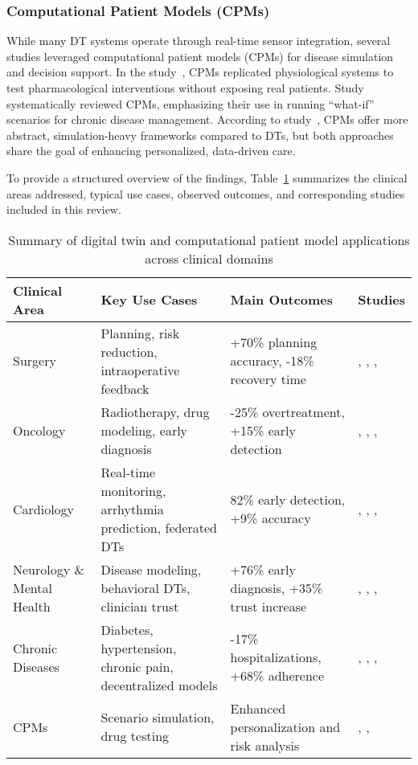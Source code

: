 \documentclass[10pt,a4paper]{article}
\begin{document}
\subsubsection*{Computational Patient Models (CPMs)}
While many DT systems operate through real-time sensor integration, several studies leveraged computational patient models (CPMs) for disease simulation and decision support.  
In the study~\cite{Balasubramanyam2024}, CPMs replicated physiological systems to test pharmacological interventions without exposing real patients.  
Study~\cite{Khater2024b} systematically reviewed CPMs, emphasizing their use in running “what-if” scenarios for chronic disease management.  
According to study~\cite{Fekonja2024}, CPMs offer more abstract, simulation-heavy frameworks compared to DTs, but both approaches share the goal of enhancing personalized, data-driven care.


To provide a structured overview of the findings, Table~\ref{tabella2} summarizes the clinical areas addressed, typical use cases, observed outcomes, and corresponding studies included in this review.

\begin{table}[H]
\centering
\caption{Summary of digital twin and computational patient model applications across clinical domains}
\label{tabella2}
\begin{tabular}{|p{2.6cm}|p{5cm}|p{5cm}|p{2cm}|}
\hline
\textbf{Clinical Area} & \textbf{Key Use Cases} & \textbf{Main Outcomes} & \textbf{Studies} \\
\hline
Surgery & Planning, risk reduction, intraoperative feedback & +70\% planning accuracy, -18\% recovery time & \cite{liu2019}, \cite{Liang2024}, \cite{Fekonja2024}, \cite{bjelland2022} \\
\hline
Oncology & Radiotherapy, drug modeling, early diagnosis & -25\% overtreatment, +15\% early detection & \cite{Cellina2023}, \cite{Puranik2022}, \cite{wu2022}, \cite{Balasubramanyam2024} \\
\hline
Cardiology & Real-time monitoring, arrhythmia prediction, federated DTs & 82\% early detection, +9\% accuracy & \cite{liu2019}, \cite{Khater2024b}, \cite{Ali2023}, \cite{Lu2023} \\
\hline
Neurology \& Mental Health & Disease modeling, behavioral DTs, clinician trust & +76\% early diagnosis, +35\% trust increase & \cite{Abilkaiyrkyzy2024}, \cite{Vidovszky2024}, \cite{Siva Sai2024}, \cite{Fekonja2024} \\
\hline
Chronic Diseases & Diabetes, hypertension, chronic pain, decentralized models & -17\% hospitalizations, +68\% adherence & \cite{Panayides2020}, \cite{Subramanian2022b}, \cite{Stephanie2024}, \cite{Venkatesh2024} \\
\hline
CPMs & Scenario simulation, drug testing & Enhanced personalization and risk analysis & \cite{Khater2024b}, \cite{Balasubramanyam2024}, \cite{Fekonja2024} \\
\hline
\end{tabular}
\end{table}
\end{document}
